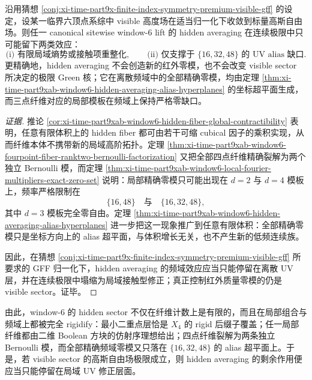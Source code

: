 \begin{conjecture}\label{conj:xi-time-part9xab-window6-lift-uv-alias-principle}
沿用猜想 \ref{conj:xi-time-part9x-finite-index-symmetry-premium-visible-gff} 的设定，设某一临界六顶点系综中 visible 高度场在适当归一化下收敛到标量高斯自由场。则任一 canonical sitewise window-\(6\) lift 的 hidden averaging 在连续极限中只可能留下两类效应：
\[
\text{(i) 有限局域熵势或接触项重整化},\qquad
\text{(ii) 仅支撑于 } \{16,32,48\}\text{ 的 UV alias 缺口}.
\]
更精确地，hidden averaging 不会创造新的红外零模，也不会改变 visible sector 所决定的极限 Green 核；它在离散频域中的全部精确零模，均由定理 \ref{thm:xi-time-part9xab-window6-hidden-averaging-alias-hyperplanes} 的坐标超平面生成，而三点纤维对应的局部模板在频域上保持严格零缺口。
\end{conjecture}
\begin{proof}[证据]
推论 \ref{cor:xi-time-part9xab-window6-hidden-fiber-global-contractibility} 表明，任意有限体积上的 hidden fiber 都可由若干可缩 cubical 因子的乘积实现，从而纤维本体不携带新的局域高阶拓扑。定理 \ref{thm:xi-time-part9xab-window6-fourpoint-fiber-ranktwo-bernoulli-factorization} 又把全部四点纤维精确裂解为两个独立 Bernoulli 模，而定理 \ref{thm:xi-time-part9xab-window6-local-fourier-multipliers-exact-zero-set} 说明：局部精确零模只可能出现在 \(d=2\) 与 \(d=4\) 模板上，频率严格限制在
\[
\{16,48\}\quad\text{与}\quad \{16,32,48\},
\]
其中 \(d=3\) 模板完全零自由。定理 \ref{thm:xi-time-part9xab-window6-hidden-averaging-alias-hyperplanes} 进一步把这一现象推广到任意有限体积：全部精确零模只是坐标方向上的 alias 超平面，与体积增长无关，也不产生新的低频连续族。

因此，在猜想 \ref{conj:xi-time-part9x-finite-index-symmetry-premium-visible-gff} 所要求的 GFF 归一化下，hidden averaging 的频域效应应当只能停留在离散 UV 层，并在连续极限中塌缩为局域接触型修正；真正控制红外质量零模的仍是 visible sector。证毕。
\end{proof}

\noindent
由此，window-\(6\) 的 hidden sector 不仅在纤维计数上是有限的，而且在局部组合与频域上都被完全 rigidify：最小二重点层恰是 \(X_4\) 的 rigid 后缀子覆盖；任一局部纤维都由二维 Boolean 方块的仿射序理想给出；四点纤维裂解为两条独立 Bernoulli 模，而全部精确频域零模又只落在 \(\{16,32,48\}\) 的 alias 超平面上。于是，若 visible sector 的高斯自由场极限成立，则 hidden averaging 的剩余作用便应当只能停留在局域 UV 修正层面。

\endinput
